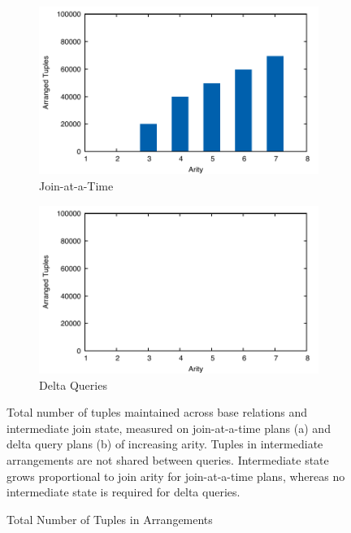 \documentclass[../catalog.tex]{subfiles}
\begin{document}
\begin{figure}[h!]
  \begin{subfigure}{.5\textwidth}
    \includegraphics[width=1.0\linewidth]{results/join-state/out/tuples_join}
    \caption{Join-at-a-Time}
  \end{subfigure}
  \begin{subfigure}{.5\textwidth}
    \includegraphics[width=1.0\linewidth]{results/join-state/out/tuples_delta}
    \caption{Delta Queries}
  \end{subfigure}

  \caption{Total Number of Tuples in Arrangements}
  \label{fig:tuple-counts}
  \medskip
  \small

  Total number of tuples maintained across base relations and
  intermediate join state, measured on join-at-a-time plans (a) and
  delta query plans (b) of increasing arity. Tuples in intermediate
  arrangements are not shared between queries. Intermediate state
  grows proportional to join arity for join-at-a-time plans, whereas
  no intermediate state is required for delta queries.
\end{figure}
\end{document}
